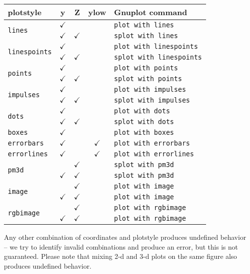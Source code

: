 \documentclass[11pt]{article}
\newcommand{\cm}{$\checkmark$}
\newcommand{\cmd}[1]{\texttt{#1}}
\begin{document}
{\small
\begin{center}
	\begin{tabular}{lcccl}
	\toprule
	\textbf{plotstyle} & \textbf{y} & \textbf{Z} & \textbf{ylow} &
	\textbf{Gnuplot command} \\
	\midrule
	\multirow{2}{*}{\cmd{lines}}
	& \cm &     &  & \cmd{plot with lines} \\
	& \cm & \cm &  & \cmd{splot with lines} \\
	\cmidrule(r){2-5}
	\multirow{2}{*}{\cmd{linespoints}}
	& \cm &     &  & \cmd{plot with linespoints} \\
	& \cm & \cm &  & \cmd{splot with linespoints} \\
	\cmidrule(r){2-5}
	\multirow{2}{*}{\cmd{points}}
	& \cm &     &  & \cmd{plot with points} \\
	& \cm & \cm &  & \cmd{splot with points} \\
	\cmidrule(r){2-5}
	\multirow{2}{*}{\cmd{impulses}}
	& \cm &     &  & \cmd{plot with impulses} \\
	& \cm & \cm &  & \cmd{splot with impulses} \\
	\cmidrule(r){2-5}
	\multirow{2}{*}{\cmd{dots}}
	& \cm &     &  & \cmd{plot with dots} \\
	& \cm & \cm &  & \cmd{splot with dots} \\
	\cmidrule(r){2-5}
	\cmd{boxes}       & \cm &  &     & \cmd{plot with boxes} \\
	\cmd{errorbars}   & \cm &  & \cm & \cmd{plot with errorbars} \\
	\cmd{errorlines}  & \cm &  & \cm & \cmd{plot with errorlines} \\
	\cmidrule(r){2-5}
	\multirow{2}{*}{\cmd{pm3d}}
	&     & \cm &  & \cmd{splot with pm3d} \\
	& \cm & \cm &  & \cmd{splot with pm3d} \\
	\cmidrule(r){2-5}
	\multirow{2}{*}{\cmd{image}}
	&     & \cm &  & \cmd{plot with image} \\
	& \cm & \cm &  & \cmd{plot with image} \\
	\cmidrule(r){2-5}
	\multirow{2}{*}{\cmd{rgbimage}}
	&     & \cm &  & \cmd{plot with rgbimage} \\
	& \cm & \cm &  & \cmd{plot with rgbimage} \\
	\bottomrule
\end{tabular}
\end{center}}

Any other combination of coordinates and plotstyle produces undefined behavior
-- we try to identify invalid combinations and produce an error, but this is
not guaranteed. Please note that mixing 2-d and 3-d plots on the same figure
also produces undefined behavior.
\end{document}
